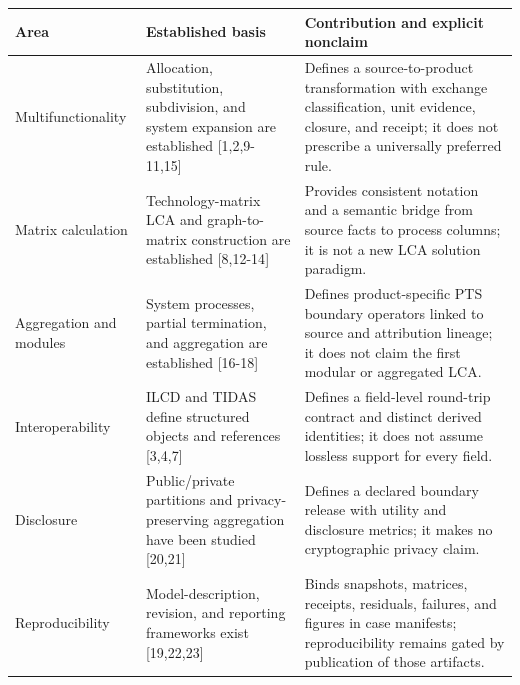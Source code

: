\documentclass[
  10pt,
  a4paper,
  DIV=11,
  numbers=noendperiod]{scrartcl}
\newcounter{none} %
\begin{document}
{\def\LTcaptype{none} %
\begin{longtable}[]{@{}
  >{\raggedright\arraybackslash}p{}
  >{\raggedright\arraybackslash}p{}
  >{\raggedright\arraybackslash}p{}@{}}
\toprule\noalign{}
\begin{minipage}[b]{\linewidth}\raggedright
Area
\end{minipage} & \begin{minipage}[b]{\linewidth}\raggedright
Established basis
\end{minipage} & \begin{minipage}[b]{\linewidth}\raggedright
Contribution and explicit nonclaim
\end{minipage} \\
\midrule\noalign{}
\endhead
\bottomrule\noalign{}
\endlastfoot
Multifunctionality & Allocation, substitution, subdivision, and system
expansion are established {[}1,2,9-11,15{]} & Defines a
source-to-product transformation with exchange classification, unit
evidence, closure, and receipt; it does not prescribe a universally
preferred rule. \\
Matrix calculation & Technology-matrix LCA and graph-to-matrix
construction are established {[}8,12-14{]} & Provides consistent
notation and a semantic bridge from source facts to process columns; it
is not a new LCA solution paradigm. \\
Aggregation and modules & System processes, partial termination, and
aggregation are established {[}16-18{]} & Defines product-specific PTS
boundary operators linked to source and attribution lineage; it does not
claim the first modular or aggregated LCA. \\
Interoperability & ILCD and TIDAS define structured objects and
references {[}3,4,7{]} & Defines a field-level round-trip contract and
distinct derived identities; it does not assume lossless support for
every field. \\
Disclosure & Public/private partitions and privacy-preserving
aggregation have been studied {[}20,21{]} & Defines a declared boundary
release with utility and disclosure metrics; it makes no cryptographic
privacy claim. \\
Reproducibility & Model-description, revision, and reporting frameworks
exist {[}19,22,23{]} & Binds snapshots, matrices, receipts, residuals,
failures, and figures in case manifests; reproducibility remains gated
by publication of those artifacts. \\
\end{longtable}
}
\end{document}
